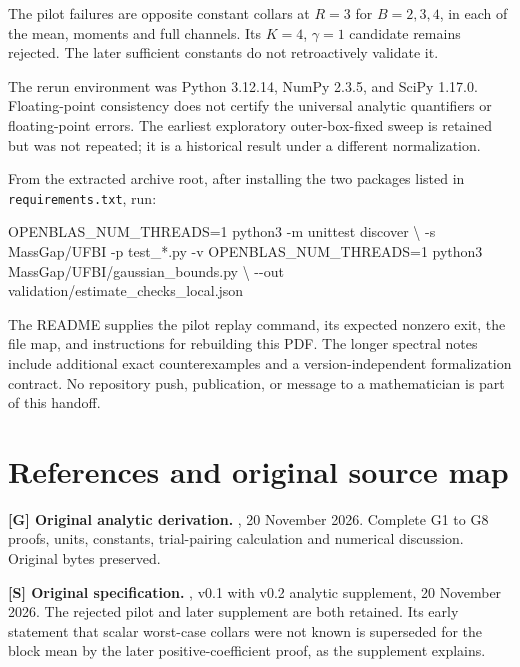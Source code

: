 \documentclass[
  11pt,
  letterpaper,
]{article}
\newenvironment{Shaded}{}{}
\newcommand{\AttributeTok}[1]{\textcolor[rgb]{0.49,0.56,0.16}{#1}}
\newcommand{\DataTypeTok}[1]{\textcolor[rgb]{0.56,0.13,0.00}{#1}}
\newcommand{\ExtensionTok}[1]{#1}
\newcommand{\NormalTok}[1]{#1}
\newcommand{\OperatorTok}[1]{\textcolor[rgb]{0.40,0.40,0.40}{#1}}
\newcommand{\StringTok}[1]{\textcolor[rgb]{0.25,0.44,0.63}{#1}}
\newcommand{\VariableTok}[1]{\textcolor[rgb]{0.10,0.09,0.49}{#1}}
\begin{document}
The pilot failures are opposite constant collars at \(R=3\) for
\(B=2,3,4\), in each of the mean, moments and full channels. Its
\(K=4\), \(\gamma=1\) candidate remains rejected. The later sufficient
constants do not retroactively validate it.

The rerun environment was Python 3.12.14, NumPy 2.3.5, and SciPy 1.17.0.
Floating-point consistency does not certify the universal analytic
quantifiers or floating-point errors. The earliest exploratory
outer-box-fixed sweep is retained but was not repeated; it is a
historical result under a different normalization.

From the extracted archive root, after installing the two packages
listed in \texttt{requirements.txt}, run:

\begin{Shaded}
\begin{Highlighting}[]
\VariableTok{OPENBLAS\_NUM\_THREADS}\OperatorTok{=}\NormalTok{1 }\ExtensionTok{python3} \AttributeTok{{-}m}\NormalTok{ unittest discover }\DataTypeTok{\textbackslash{}}
  \AttributeTok{{-}s}\NormalTok{ MassGap/UFBI }\AttributeTok{{-}p} \StringTok{\textquotesingle{}test\_*.py\textquotesingle{}} \AttributeTok{{-}v}
\VariableTok{OPENBLAS\_NUM\_THREADS}\OperatorTok{=}\NormalTok{1 }\ExtensionTok{python3}\NormalTok{ MassGap/UFBI/gaussian\_bounds.py }\DataTypeTok{\textbackslash{}}
  \AttributeTok{{-}{-}out}\NormalTok{ validation/estimate\_checks\_local.json}
\end{Highlighting}
\end{Shaded}

The README supplies the pilot replay command, its expected nonzero exit,
the file map, and instructions for rebuilding this PDF. The longer
spectral notes include additional exact counterexamples and a
version-independent formalization contract. No repository push,
publication, or message to a mathematician is part of this handoff.

\section{References and original source
map}\label{references-and-original-source-map}

\textbf{{[}G{]} Original analytic derivation.}
, 20 November 2026.
Complete G1 to G8 proofs, units, constants, trial-pairing calculation
and numerical discussion. Original bytes preserved.

\textbf{{[}S{]} Original specification.}
, v0.1 with v0.2 analytic
supplement, 20 November 2026. The rejected pilot and later supplement
are both retained. Its early statement that scalar worst-case collars
were not known is superseded for the block mean by the later
positive-coefficient proof, as the supplement explains.
\end{document}
